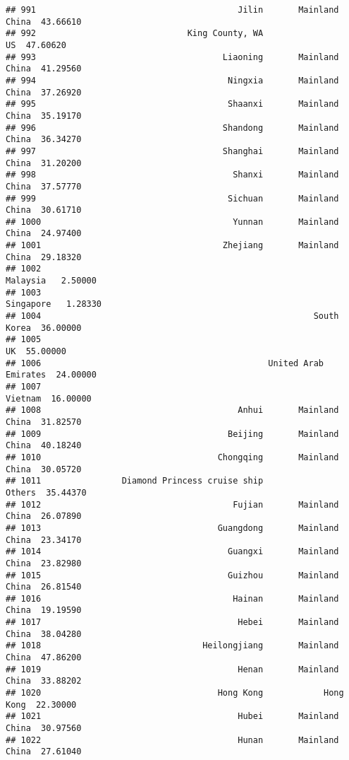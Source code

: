 \documentclass[
]{article}
\begin{document}
\begin{verbatim}
## 991                                        Jilin       Mainland China  43.66610
## 992                              King County, WA                   US  47.60620
## 993                                     Liaoning       Mainland China  41.29560
## 994                                      Ningxia       Mainland China  37.26920
## 995                                      Shaanxi       Mainland China  35.19170
## 996                                     Shandong       Mainland China  36.34270
## 997                                     Shanghai       Mainland China  31.20200
## 998                                       Shanxi       Mainland China  37.57770
## 999                                      Sichuan       Mainland China  30.61710
## 1000                                      Yunnan       Mainland China  24.97400
## 1001                                    Zhejiang       Mainland China  29.18320
## 1002                                                         Malaysia   2.50000
## 1003                                                        Singapore   1.28330
## 1004                                                      South Korea  36.00000
## 1005                                                               UK  55.00000
## 1006                                             United Arab Emirates  24.00000
## 1007                                                          Vietnam  16.00000
## 1008                                       Anhui       Mainland China  31.82570
## 1009                                     Beijing       Mainland China  40.18240
## 1010                                   Chongqing       Mainland China  30.05720
## 1011                Diamond Princess cruise ship               Others  35.44370
## 1012                                      Fujian       Mainland China  26.07890
## 1013                                   Guangdong       Mainland China  23.34170
## 1014                                     Guangxi       Mainland China  23.82980
## 1015                                     Guizhou       Mainland China  26.81540
## 1016                                      Hainan       Mainland China  19.19590
## 1017                                       Hebei       Mainland China  38.04280
## 1018                                Heilongjiang       Mainland China  47.86200
## 1019                                       Henan       Mainland China  33.88202
## 1020                                   Hong Kong            Hong Kong  22.30000
## 1021                                       Hubei       Mainland China  30.97560
## 1022                                       Hunan       Mainland China  27.61040

\end{verbatim}
\end{document}
